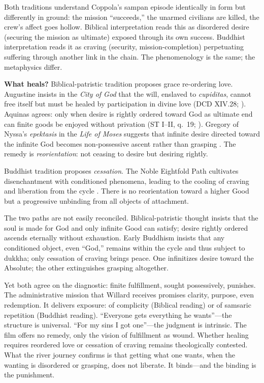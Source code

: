 Both traditions understand Coppola's sampan episode identically in form but differently in
ground: the mission ``succeeds,'' the unarmed civilians are killed, the crew's affect goes
hollow. Biblical interpretation reads this as disordered desire (securing the mission as
ultimate) exposed through its own success. Buddhist interpretation reads it as craving
(security, mission-completion) perpetuating suffering through another link in the chain. The
phenomenology is the same; the metaphysics differ.

\textbf{What heals?} Biblical-patristic tradition proposes grace re-ordering love. Augustine
insists in the \emph{City of God} that the will, enslaved to \emph{cupiditas}, cannot free
itself but must be healed by participation in divine love (DCD XIV.28;
\parencite{AugustineCity2003}). Aquinas agrees: only when desire is rightly ordered toward God
as ultimate end can finite goods be enjoyed without privation (ST I--II, q.~19;
\parencite{AquinasST1947}). Gregory of Nyssa's \emph{epektasis} in the \emph{Life of Moses}
suggests that infinite desire directed toward the infinite God becomes non-possessive ascent
rather than grasping \parencite[pp.~113--114]{GregoryMoses1978}. The remedy is
\emph{reorientation}: not ceasing to desire but desiring rightly.

Buddhist tradition proposes \emph{cessation}. The Noble Eightfold Path cultivates
disenchantment with conditioned phenomena, leading to the cooling of craving and liberation
from the cycle \parencite[pp.~45--50]{Rahula1959}. There is no reorientation toward a higher
Good but a progressive unbinding from all objects of attachment.

The two paths are not easily reconciled. Biblical-patristic thought insists that the soul is
made for God and only infinite Good can satisfy; desire rightly ordered ascends eternally
without exhaustion. Early Buddhism insists that any conditioned object, even ``God,'' remains
within the cycle and thus subject to dukkha; only cessation of craving brings peace. One
infinitizes desire toward the Absolute; the other extinguishes grasping altogether.

Yet both agree on the diagnostic: finite fulfillment, sought possessively, punishes. The
administrative mission that Willard receives promises clarity, purpose, even redemption. It
delivers exposure: of complicity (Biblical reading) or of samsaric repetition (Buddhist
reading). ``Everyone gets everything he wants''---the structure is universal. ``For my sins I
got one''---the judgment is intrinsic. The film offers no remedy, only the vision of
fulfillment as wound. Whether healing requires reordered love or cessation of craving remains
theologically contested. What the river journey confirms is that getting what one wants, when
the wanting is disordered or grasping, does not liberate. It binds---and the binding is the
punishment.
